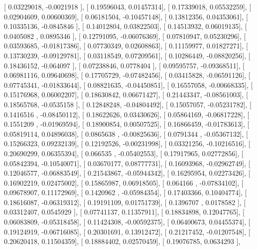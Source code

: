 \documentclass{article}
\begin{document}
       [ 0.03229018, -0.0021918 ],
       [ 0.19596043,  0.01457314],
       [ 0.17339018,  0.05532259],
       [ 0.02904609,  0.00600369],
       [ 0.06181504, -0.10457148],
       [ 0.13812356,  0.04353061],
       [ 0.10335136, -0.0845846 ],
       [ 0.14012804,  0.03822503],
       [ 0.14513932,  0.06019135],
       [ 0.0405082 ,  0.0895346 ],
       [ 0.12791095, -0.06076369],
       [ 0.07810947,  0.05230296],
       [ 0.03593685, -0.01817386],
       [ 0.07730349,  0.02608863],
       [ 0.11159977,  0.01827271],
       [ 0.13730239, -0.09129781],
       [ 0.03118549,  0.07209561],
       [ 0.10286449, -0.08820256],
       [ 0.18436152, -0.064097  ],
       [ 0.07238846,  0.0778404 ],
       [ 0.09595757, -0.09368511],
       [ 0.06981116,  0.09640698],
       [ 0.17705729, -0.07482456],
       [ 0.03415828, -0.06591126],
       [ 0.07745341, -0.01833644],
       [ 0.08821635, -0.04450851],
       [ 0.16557058, -0.00668335],
       [ 0.15176968,  0.06002207],
       [ 0.18630842,  0.06671427],
       [ 0.21443347, -0.08561003],
       [ 0.18565768, -0.0535158 ],
       [ 0.12848248, -0.04804492],
       [ 0.15057057, -0.05231782],
       [ 0.1416516 , -0.08450112],
       [ 0.18622626,  0.03430626],
       [ 0.05864169, -0.06817228],
       [ 0.1551209 , -0.01969594],
       [ 0.18900854,  0.00507525],
       [ 0.16866459, -0.01783613],
       [ 0.05819114,  0.04896038],
       [ 0.0865638 , -0.00825636],
       [ 0.0791344 , -0.05367132],
       [ 0.15266323,  0.09232139],
       [ 0.12192526, -0.00231998],
       [ 0.03321256, -0.10216516],
       [ 0.20690299,  0.06355394],
       [ 0.066535  , -0.05402553],
       [ 0.17917965,  0.02772856],
       [ 0.05842394, -0.10540071],
       [ 0.03670177,  0.08777731],
       [ 0.16093968, -0.02962749],
       [ 0.12046577, -0.06883549],
       [ 0.21543867, -0.05944342],
       [ 0.16295954,  0.02273426],
       [ 0.16902219,  0.02475002],
       [ 0.15865987,  0.06918505],
       [ 0.064166  , -0.07834102],
       [ 0.09678907,  0.11172969],
       [ 0.1420962 , -0.05984354],
       [ 0.17403366,  0.10404774],
       [ 0.18616087, -0.06319312],
       [ 0.19191109,  0.01751739],
       [ 0.1396707 ,  0.0178582 ],
       [ 0.03312407,  0.0545929 ],
       [ 0.07741137,  0.11357911],
       [ 0.18834898,  0.12047765],
       [ 0.06083809, -0.05318458],
       [ 0.11424308, -0.00592375],
       [ 0.06400673,  0.04455374],
       [ 0.19124919, -0.06716085],
       [ 0.20301691,  0.13912472],
       [ 0.21217452, -0.01207548],
       [ 0.20620418,  0.11504359],
       [ 0.18884402,  0.02570459],
       [ 0.19076785,  0.0634293 ],
\end{document}
